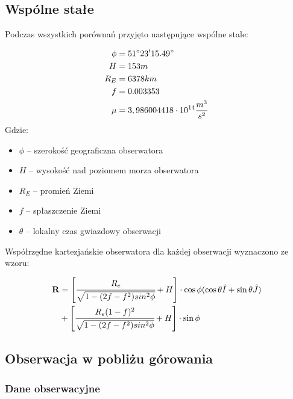 \subsection{Wspólne stałe}
Podczas wszystkich porównań przyjęto następujące wspólne stale:

        \begin{align*}
             \phi &= 51\degree 23'15.49" \\
             H &= 153 m \\
             R_{E} &= 6378 km \\
             f &= 0.003353 \\
             \mu &= 3,986004418 \cdot 10^{14} \frac{m^3}{s^2}
        \end{align*}
    Gdzie:
        \begin{itemize}
            \item  $ \phi$  -- szerokość geograficzna obserwatora 
            \item $H$ -- wysokość nad poziomem morza obserwatora
            \item       $ R_{E}$ -- promień Ziemi  
            \item        $f$ -- spłaszczenie Ziemi 
            \item $\theta$ -- lokalny czas gwiazdowy obserwacji
        \end{itemize}
        
Współrzędne kartezjańskie obserwatora dla każdej obserwacji wyznaczono ze wzoru:

            \begin{center}
            \begin{equation}
              \begin{split}
              \mathbf{R} & =\left[ \cfrac{R_e}{\sqrt{1-(2f-f^2)sin^2\phi}} + H\right]\cdot \cos{\phi}(\cos{{\theta}\hat{I}+\sin{\theta}\hat{J}}) \\
            &+  \left[ \cfrac{R_e(1-f)^2}{\sqrt{1-(2f-f^2)sin^2\phi}} + H\right] \cdot \sin{\phi} 
            \end{split}
            \end{equation}
        \end{center}



\FloatBarrier
\subsection{Obserwacja w pobliżu górowania}
\label{sub:Krotki}
      \subsubsection{Dane obserwacyjne}

